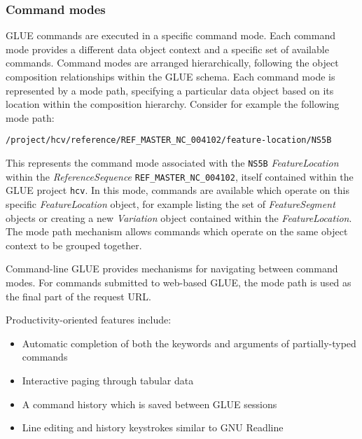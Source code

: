 

\subsubsection*{Command modes} GLUE commands are executed in a specific command
mode. Each command mode provides a different data object context and a specific
set of available commands. Command modes are arranged hierarchically, following
the object composition relationships within the GLUE schema.
Each command mode is represented by a mode path, specifying a particular data
object based on its location within the composition hierarchy.
Consider for example the following mode path:
\begin{center}
\begin{verbatim}
/project/hcv/reference/REF_MASTER_NC_004102/feature-location/NS5B
\end{verbatim}
\end{center}
This represents the command mode associated with the \texttt{NS5B}
\emph{FeatureLocation} within the \emph{ReferenceSequence} 
\texttt{REF\_MASTER\_NC\_004102}, itself contained within the GLUE project
\texttt{hcv}. In this mode, commands are available which operate on this
specific \emph{FeatureLocation} object, for example listing the
set of \emph{FeatureSegment} objects or creating a new
\emph{Variation} object contained within the \emph{FeatureLocation}. The mode
path mechanism allows commands which operate on the same object context
to be grouped together.

Command-line GLUE provides mechanisms for navigating between command modes. For
commands submitted to web-based GLUE, the mode path is used as the final part of
the request URL. 



Productivity-oriented features include:
\begin{itemize}
  \item Automatic completion of both the keywords and arguments of partially-typed commands
  \item Interactive paging through tabular data
  \item A command history which is saved between GLUE sessions
  \item Line editing and history keystrokes similar to GNU Readline
\end{itemize}
